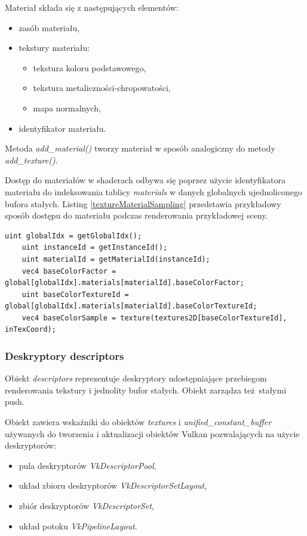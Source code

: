 Materiał składa się z następujących elementów:
\begin{itemize}
	\item zasób materiału,
	\item tekstury materiału:
	\begin{itemize}
		\item tekstura koloru podstawowego,
		\item tekstura metaliczności-chropowatości,
		\item mapa normalnych,
	\end{itemize}
	\item identyfikator materiału.
\end{itemize}

Metoda \textit{add\_material()} tworzy materiał w sposób analogiczny do metody \textit{add\_texture()}.

Dostęp do materiałów w shaderach odbywa się poprzez użycie identyfikatora materiału do indeksowania tablicy \textit{materials} w danych globalnych ujednoliconego bufora stałych.
Listing \ref{textureMaterialSampling} przedstawia przykładowy sposób dostępu do materiału podczas renderowania przykładowej sceny.
\lstset{language=GLSL}
\begin{lstlisting}[caption={Przykład dostępu do materiału podczas renderowania przykładowej sceny},captionpos=b,label={textureMaterialSampling}]
	uint globalIdx = getGlobalIdx();
	uint instanceId = getInstanceId();
	uint materialId = getMaterialId(instanceId);
	vec4 baseColorFactor = global[globalIdx].materials[materialId].baseColorFactor;
	uint baseColorTextureId = global[globalIdx].materials[materialId].baseColorTextureId;
	vec4 baseColorSample = texture(textures2D[baseColorTextureId], inTexCoord);
\end{lstlisting} 

 
\subsubsection{Deskryptory descriptors}
Obiekt \textit{descriptors} reprezentuje deskryptory udostępniające przebiegom renderowania tekstury i jednolity bufor stałych. Obiekt zarządza też stałymi push.

Obiekt zawiera wskaźniki do obiektów \textit{textures} i \textit{unified\_constant\_buffer} używanych do tworzenia i aktualizacji obiektów Vulkan pozwalających na użycie deskryptorów:
\begin{itemize}
	\item pula deskryptorów \textit{VkDescriptorPool},
	\item układ zbioru deskryptorów \textit{VkDescriptorSetLayout},
	\item zbiór deskryptorów \textit{VkDescriptorSet},
	\item układ potoku \textit{VkPipelineLayout}.
\end{itemize} 

